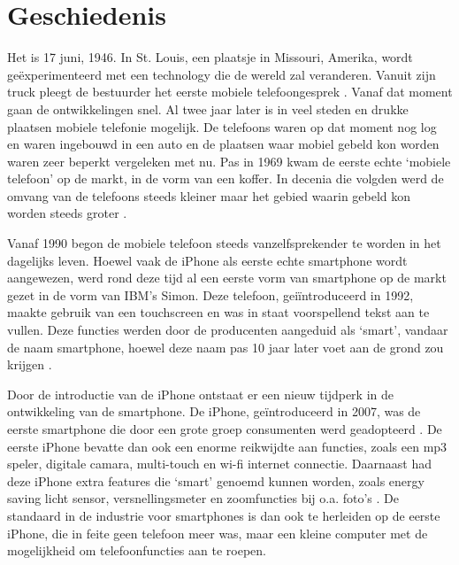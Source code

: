 \chapter{Geschiedenis}

Het is 17 juni, 1946.
In St. Louis, een plaatsje in Missouri, Amerika, wordt ge\"experimenteerd met een technology die de wereld zal veranderen.
Vanuit zijn truck pleegt de bestuurder het eerste mobiele telefoongesprek \citep{ATnT}.
Vanaf dat moment gaan de ontwikkelingen snel.
Al twee jaar later is in veel steden en drukke plaatsen mobiele telefonie mogelijk.
De telefoons waren op dat moment nog log en waren ingebouwd in een auto en de plaatsen waar mobiel gebeld kon worden waren zeer beperkt vergeleken met nu.
Pas in 1969 kwam de eerste echte `mobiele telefoon' op de markt, in de vorm van een koffer.
In decenia die volgden werd de omvang van de telefoons steeds kleiner maar het gebied waarin gebeld kon worden steeds groter \citep{Farley}.

Vanaf 1990 begon de mobiele telefoon steeds vanzelfsprekender te worden in het dagelijks leven.
Hoewel vaak de iPhone als eerste echte smartphone wordt aangewezen, werd rond deze tijd al een eerste vorm van smartphone op de markt gezet in de vorm van IBM's Simon.
Deze telefoon, gei\"introduceerd in 1992, maakte gebruik van een touchscreen en was in staat voorspellend tekst aan te vullen.
Deze functies werden door de producenten aangeduid als `smart', vandaar de naam smartphone, hoewel deze naam pas 10 jaar later voet aan de grond zou krijgen \citep{BusinessWeek}.

Door de introductie van de iPhone ontstaat er een nieuw tijdperk in de ontwikkeling van de smartphone.
De iPhone, ge\"introduceerd in 2007, was de eerste smartphone die door een grote groep consumenten werd geadopteerd \citep{Hall}.
De eerste iPhone bevatte dan ook een enorme reikwijdte aan functies, zoals een mp3 speler, digitale camara, multi-touch en wi-fi internet connectie.
Daarnaast had deze iPhone extra features die `smart' genoemd kunnen worden, zoals energy saving licht sensor, versnellingsmeter en zoomfuncties bij o.a. foto's \citep{MacWorld}.
De standaard in de industrie voor smartphones is dan ook te herleiden op de eerste iPhone, die in feite geen telefoon meer was, maar een kleine computer met de mogelijkheid om telefoonfuncties aan te roepen.
